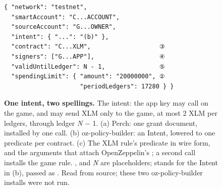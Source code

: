 \begin{figure}[tbp]
\begin{minipage}[t]{0.49\linewidth}
\begin{Verbatim}[fontsize=\scriptsize,frame=single,framesep=1.5mm]
{ "network": "testnet",
  "smartAccount": "C...ACCOUNT",
  "sourceAccount": "G...OWNER",
  "intent": { "...": "(b)" },
  "contract": "C...XLM",                   ③
  "signers": ["G...APP"],                  ④
  "validUntilLedger": N - 1,               ⑤
  "spendingLimit": { "amount": "20000000", ②
                     "periodLedgers": 17280 } }
\end{Verbatim}
\end{minipage}
\caption{\textbf{One intent, two spellings.} The intent: the app key may call  on the game, and may send XLM only to the game, at most 2 XLM per  ledgers, through ledger \emph{N} \ensuremath{-} 1. (a) Perch: one grant document, installed by one  call. (b) oz-policy-builder: an Intent, lowered to one predicate per contract. (c) The XLM rule's predicate in wire form, and the  arguments that attach OpenZeppelin's ; a second call installs the game rule. ,  and \emph{N} are placeholders;  stands for the Intent in (b), passed as . Read from source; these two oz-policy-builder installs were not run.}\label{fig:fig-two-spellings}
\end{figure}
